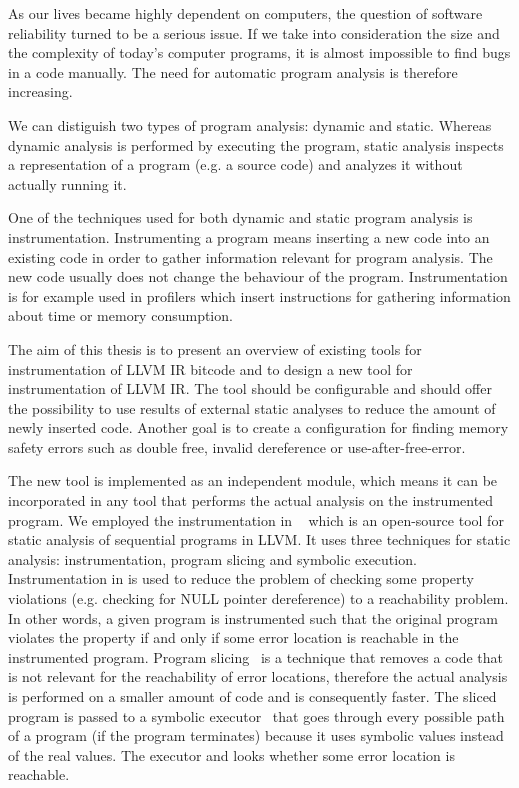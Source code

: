 As our lives became highly dependent on computers, the question of software
reliability turned to be a serious issue. If we take into consideration the
size and the complexity of today's computer programs, it is almost impossible
to find bugs in a code manually. The need for automatic program analysis is
therefore increasing.

We can distiguish two types of program analysis: dynamic and static. Whereas
dynamic analysis is performed by executing the program, static analysis
inspects a representation of a program (e.g. a source code) and analyzes it
without actually running it.

One of the techniques used for both dynamic and static program analysis is
instrumentation. Instrumenting a program means inserting a new code into an
existing code in order to gather information relevant for program analysis. The
new code usually does not change the behaviour of the program. Instrumentation
is for example used in profilers which insert instructions for gathering
information about time or memory consumption. 

The aim of this thesis is to present an overview of existing tools for
instrumentation of LLVM IR bitcode and to design a new tool for
instrumentation of LLVM IR. The tool should be configurable and should offer the
possibility to use results of external static analyses to reduce the amount of
newly inserted code. Another goal is to create a configuration for finding
memory safety errors such as double free, invalid dereference or
use-after-free-error.

The new tool is implemented as an independent module, which means it can be
incorporated in any tool that performs the actual analysis on the instrumented
program. We employed the instrumentation in \symbiotic~\cite{Symbiotic} which
is an open-source tool for static analysis of sequential programs in LLVM. It
uses three techniques for static analysis: instrumentation, program slicing and
symbolic execution. Instrumentation in \symbiotic is used to reduce the problem
of checking some property violations (e.g. checking for NULL pointer
dereference) to a reachability problem. In other words, a given program is
instrumented such that the original program violates the property if and only
if some error location is reachable in the instrumented program. Program
slicing~\cite{weiser} is a technique that removes a code that is not
relevant for the reachability of error locations, therefore the actual
analysis is performed on a smaller amount of code and is consequently
faster. The sliced program is passed to a symbolic executor~\cite{King} that goes
through every possible path of a program (if the program terminates)
because it uses symbolic values instead of the real values. The executor and
looks whether some error location is reachable.


